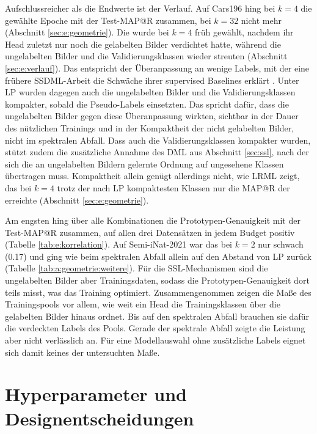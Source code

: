 Aufschlussreicher als die Endwerte ist der Verlauf. Auf Cars196 hing bei $k=4$ die gewählte Epoche mit der Test-\ac{MAP@R} zusammen, bei $k=32$ nicht mehr (Abschnitt \ref{sec:e:geometrie}). Die \UEBL wurde bei $k=4$ früh gewählt, nachdem ihr Head zuletzt nur noch die gelabelten Bilder verdichtet hatte, während die ungelabelten Bilder und die Validierungsklassen wieder streuten (Abschnitt \ref{sec:e:verlauf}). Das entspricht der Überanpassung an wenige Labels, mit der eine frühere \ac{SSDML}-Arbeit die Schwäche ihrer supervised Baselines erklärt \cite{dutta_semi-supervised_2021}. Unter \ac{LP} wurden dagegen auch die ungelabelten Bilder und die Validierungsklassen kompakter, sobald die Pseudo-Labels einsetzten. Das spricht dafür, dass die ungelabelten Bilder gegen diese Überanpassung wirkten, sichtbar in der Dauer des nützlichen Trainings und in der Kompaktheit der nicht gelabelten Bilder, nicht im spektralen Abfall. Dass auch die Validierungsklassen kompakter wurden, stützt zudem die zusätzliche Annahme des \ac{DML} aus Abschnitt \ref{sec:ssl}, nach der sich die an ungelabelten Bildern gelernte Ordnung auf ungesehene Klassen übertragen muss. Kompaktheit allein genügt allerdings nicht, wie \ac{LRML} zeigt, das bei $k=4$ trotz der nach \ac{LP} kompaktesten Klassen nur die \ac{MAP@R} der \UEBL erreichte (Abschnitt \ref{sec:e:geometrie}).

Am engsten hing über alle Kombinationen die Prototypen-Genauigkeit mit der Test-\ac{MAP@R} zusammen, auf allen drei Datensätzen in jedem Budget positiv (Tabelle \ref{tab:e:korrelation}). Auf Semi-iNat-2021 war das bei $k=2$ nur schwach (\num{0.17}) und ging wie beim spektralen Abfall allein auf den Abstand von \ac{LP} zurück (Tabelle \ref{tab:a:geometrie:weitere}). Für die \ac{SSL}-Mechanismen sind die ungelabelten Bilder aber Trainingsdaten, sodass die Prototypen-Genauigkeit dort teils misst, was das Training optimiert. Zusammengenommen zeigen die Maße des Trainingspools vor allem, wie weit ein Head die Trainingsklassen über die gelabelten Bilder hinaus ordnet. Bis auf den spektralen Abfall brauchen sie dafür die verdeckten Labels des Pools. Gerade der spektrale Abfall zeigte die Leistung aber nicht verlässlich an. Für eine Modellauswahl ohne zusätzliche Labels eignet sich damit keines der untersuchten Maße.

\section{Hyperparameter und Designentscheidungen}
\label{sec:d:hyperparameter}

